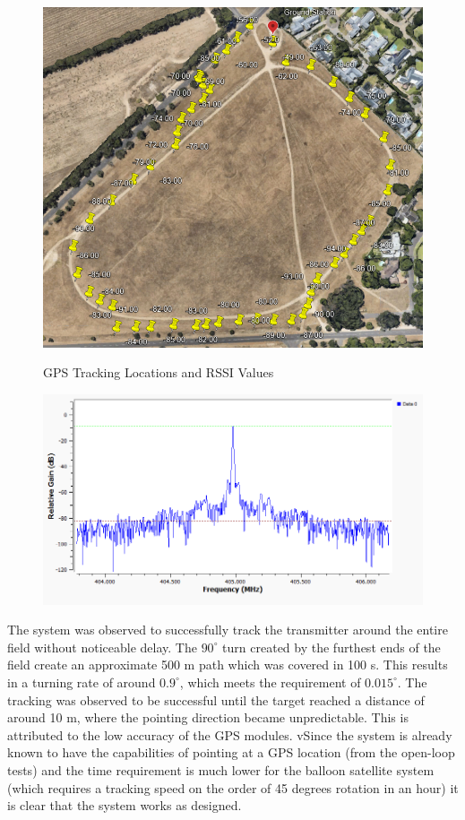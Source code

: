 \begin{figure}[!htb]
  \begin{minipage}{.49\textwidth}
    \centering
    \includegraphics[width=0.95\linewidth]{gpsTrackingMap}
    \caption{GPS Tracking Locations and RSSI Values}
    \label{fig:gpsTrackingMap}
  \end{minipage}
  \begin{minipage}{.49\textwidth}
    \centering
    \includegraphics[width=0.95\linewidth]{radiosondeSpectrum}
    \caption{}
    \label{fig:radiosondeSpectrum}
  \end{minipage}
\end{figure}

The system was observed to successfully track the transmitter around the entire field without noticeable delay. The $90^\circ$ turn created by the furthest ends of the field create an approximate 500 m path which was covered in 100 s. This results in a turning rate of around $0.9 ^ \circ$, which meets the requirement of $0.015 ^ \circ$. The tracking was observed to be successful until the target reached a distance of around 10 m, where the pointing direction became unpredictable. This is attributed to the low accuracy of the GPS modules. vSince the system is already known to have the capabilities of pointing at a GPS location (from the open-loop tests) and the time requirement is much lower for the balloon satellite system (which requires a tracking speed on the order of 45 degrees rotation in an hour) it is clear that the system works as designed.

